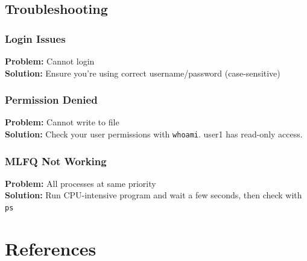 \documentclass[a4paper,12pt]{report}
\begin{document}
\section{Troubleshooting}

\subsection{Login Issues}

\textbf{Problem:} Cannot login\\
\textbf{Solution:} Ensure you're using correct username/password (case-sensitive)

\subsection{Permission Denied}

\textbf{Problem:} Cannot write to file\\
\textbf{Solution:} Check your user permissions with \texttt{whoami}. user1 has read-only access.

\subsection{MLFQ Not Working}

\textbf{Problem:} All processes at same priority\\
\textbf{Solution:} Run CPU-intensive program and wait a few seconds, then check with \texttt{ps}

\chapter{References}
\thispagestyle{contentpages}
\end{document}
